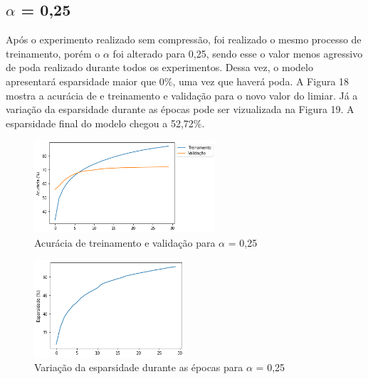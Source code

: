 \subsection{$\alpha$ = 0,25}
Após o experimento realizado sem compressão, foi realizado o mesmo processo de treinamento, porém o $\alpha$ foi alterado para 0,25, sendo esse o valor menos agressivo de poda realizado durante todos os experimentos. Dessa vez, o modelo apresentará esparsidade maior que 0\%, uma vez que haverá poda. A Figura 18 mostra a acurácia de e treinamento e validação para o novo valor do limiar. Já a variação da esparsidade durante as épocas pode ser vizualizada na Figura 19. A esparsidade final do modelo chegou a 52,72\%.

\begin{figure}[H]
	\includegraphics[width=0.6\textwidth, keepaspectratio=true]{figuras/CAP4/acuracia025.png}
	\centering
	\caption[Acurácia de treinamento e validação para $\alpha$ = 0,25]{Acurácia de treinamento e validação para $\alpha$ = 0,25}
\end{figure}

\begin{figure}[H]
	\includegraphics[width=0.5\textwidth, keepaspectratio=true]{figuras/CAP4/esparsidade025.png}
	\centering
	\caption[Variação da esparsidade durante as épocas para $\alpha$ = 0,25]{Variação da esparsidade durante as épocas para $\alpha$ = 0,25}
\end{figure}

